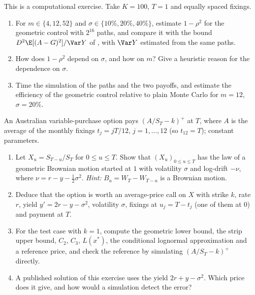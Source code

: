 \begin{exercise}\label{ex:as-cv-lab}
\medium This is a computational exercise. Take $K=100$, $T=1$ and equally spaced fixings.
\begin{enumerate}[label=(\alph*)]
  \item For $m\in\{4,12,52\}$ and $\sigma\in\{10\%,20\%,40\%\}$, estimate $1-\rho^2$ for the
    geometric control with $2^{16}$ paths, and compare it with the bound
    $D^2\E[(A-G)^2]/\Var Y$ of , with $\Var Y$ estimated from the same
    paths.
  \item How does $1-\rho^2$ depend on $\sigma$, and how on $m$? Give a heuristic reason for the
    dependence on $\sigma$.
  \item Time the simulation of the paths and the two payoffs, and estimate the efficiency of the
    geometric control relative to plain Monte Carlo for $m=12$, $\sigma=20\%$.
\end{enumerate}
\end{exercise}

\begin{exercise}\label{ex:as-oz}
\hard An Australian variable-purchase option pays $(A/S_T-k)^+$ at $T$, where $A$ is the average
of the monthly fixings $t_j=jT/12$, $j=1,\dots,12$ (so $t_{12}=T$); constant parameters.
\begin{enumerate}[label=(\alph*)]
  \item Let $X_u=S_{T-u}/S_T$ for $0\le u\le T$. Show that $(X_u)_{0\le u\le T}$ has the law of
    a geometric Brownian motion started at $1$ with volatility $\sigma$ and log-drift $-\nu$, where
    $\nu=r-y-\frac12\sigma^2$. \emph{Hint:} $B_u=W_T-W_{T-u}$ is a Brownian motion.
  \item Deduce that the option is worth an average-price call on $X$ with strike $k$, rate $r$,
    yield $y'=2r-y-\sigma^2$, volatility $\sigma$, fixings at $u_j=T-t_j$ (one of them at $0$)
    and payment at $T$.
  \item For the test case with $k=1$, compute the geometric lower bound, the strip upper bound,
    $C_2$, $C_3$, $L(x^*)$, the conditional lognormal approximation and a reference price, and
    check the reference by simulating $(A/S_T-k)^+$ directly.
  \item A published solution of this exercise uses the yield $2r+y-\sigma^2$. Which price does it
    give, and how would a simulation detect the error?
\end{enumerate}
\end{exercise}

